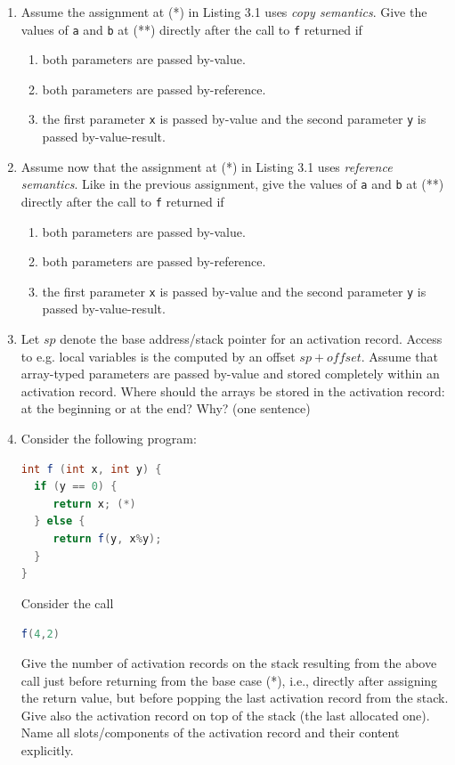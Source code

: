 \documentclass{article}
\begin{document}
\begin{enumerate}
\item Assume the assignment at (*) in
  Listing 3.1 uses
  \emph{copy semantics}. Give the values of \texttt{a} and \texttt{b}
  at (**) directly after the call to \texttt{f} returned if
  \begin{enumerate}
  \item both parameters are passed by-value.
  \item both parameters are passed by-reference.
  \item the first parameter \texttt{x} is passed by-value and the
    second parameter \texttt{y} is passed by-value-result.
  \end{enumerate}
\item Assume now that the assignment at
  (*) in Listing 3.1 uses \emph{reference semantics}. Like in the
  previous assignment, give the values of \texttt{a} and \texttt{b} at
  (**) directly after the call to \texttt{f} returned if
  \begin{enumerate}
  \item both parameters are passed by-value.
  \item both parameters are passed by-reference.
  \item the first parameter \texttt{x} is passed by-value and the
    second parameter \texttt{y} is passed by-value-result. 
  \end{enumerate}  
\item Let $sp$ denote the base
  address/stack pointer for an activation record. Access to e.g. local
  variables is the computed by an offset $sp+\mathit{offset}$. Assume
  that array-typed parameters are passed by-value and stored
  completely within an activation record. Where should the arrays be
  stored in the activation record: at the beginning or at the end? Why?
  (one sentence)    \newpage
\item Consider the following program:
\begin{lstlisting}[language=Java, columns=flexible]
int f (int x, int y) {
  if (y == 0) { 
     return x; (*) 
  } else {
     return f(y, x%y);
  }
}
\end{lstlisting}
Consider the call 
\begin{center}
  \lstinline[language=Java, columns=flexible]{f(4,2)} 
\end{center}
Give the number of activation records on the stack resulting from the
above call just before returning from the base case (*), i.e.,
directly after assigning the return value, but before popping the last
activation record from the stack. Give also the activation record on
top of the stack (the last allocated one). Name all slots/components
of the activation record and their content explicitly. 
\end{enumerate}
\end{document}
